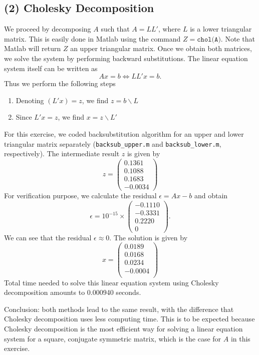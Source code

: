 \documentclass[11pt]{article}
\newcommand{\1}{\mathbbm{1}}
\begin{document}
\subsection*{(2) Cholesky Decomposition}
We proceed by decomposing $A$ such that $A=LL'$, where $L$ is a lower triangular matrix. This is easily done in Matlab using the command $Z= \texttt{chol(A)}$. Note that Matlab will return $Z$ an upper triangular matrix. Once we obtain both matrices, we solve the system by performing backward substitutions. The linear equation system itself can be written as 
\[Ax=b \Leftrightarrow LL'x =b.\]
Thus we perform the following steps
\begin{enumerate}
	\item Denoting $(L'x) =z$, we find $z = b\backslash L$
	\item Since $L'x = z$, we find $x=z\backslash L'$
\end{enumerate} 
For this exercise, we coded backsubstitution algorithm for an upper and lower triangular matrix separately (\texttt{backsub\_upper.m} and \texttt{backsub\_lower.m}, respectively). The intermediate result $z$ is given by
\[
z = \begin{pmatrix}
 0.1361\\
0.1088\\
0.1683\\
-0.0034
\end{pmatrix}
\]
For verification purpose, we calculate the residual $\epsilon = Ax-b$ and obtain
\[
\epsilon =   10^{-15} \times \begin{pmatrix}
   -0.1110\\
-0.3331\\
0.2220\\
0
\end{pmatrix}.
\]
We can see that the residual $\epsilon\approx0$. The solution is given by
\[x = \begin{pmatrix}
	0.0189\\
	0.0168\\
	0.0234\\
	-0.0004\\
\end{pmatrix}\]
Total time needed to solve this linear equation system using Cholesky decomposition amounts to 0.000940 seconds.

Conclusion: both methods lead to the same result, with the difference that Cholesky decomposition uses less computing time. This is to be expected because Cholesky decomposition is the most efficient way for solving a linear equation system for a square, conjugate symmetric matrix, which is the case for $A$ in this exercise. 
\end{document}
